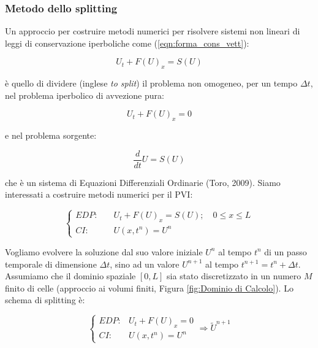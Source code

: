 \documentclass[12pt]{article} %
\begin{document}
\subsubsection{Metodo dello splitting}

\noindent Un approccio per costruire metodi numerici per risolvere sistemi non lineari di leggi di conservazione iperboliche come (\ref{eqn:forma_cons_vett}):

\begin{equation}
    U_t+F(U)_x=S(U)
    \label{eqn:sistema_EDP_non_omogenea}
\end{equation}

\noindent è quello di dividere (inglese \textit{to split}) il problema non omogeneo, per un tempo $\Delta t$, nel problema iperbolico di avvezione pura:

\begin{equation}
    U_t+F(U)_x = 0
    \label{eqn:avvezione_pura}
\end{equation}

\noindent e nel problema sorgente:

\begin{equation}
    \frac{d}{dt}U = S(U)
    \label{eqn:sorgente}
\end{equation}

\noindent che è un sistema di Equazioni Differenziali Ordinarie (Toro, 2009).
Siamo interessati a costruire metodi numerici per il PVI:

\begin{equation}
    \begin{cases} EDP:\quad &U_t+F(U)_x = S(U);\quad 0\leq x \leq L\\
    CI: &U(x,t^n)=U^n
    \end{cases}
    \label{eqn:PVI_completo}
\end{equation}

\noindent Vogliamo evolvere la soluzione dal suo valore iniziale $U^n$ al tempo $t^n$ di un passo temporale di dimensione $\Delta t$, sino ad un valore $U^{n+1}$ al tempo $t^{n+1} = t^n + \Delta t$. Assumiamo che il dominio spaziale $[0, L]$ sia stato discretizzato in un numero $M$ finito di celle (approccio ai volumi finiti, Figura \ref{fig:Dominio di Calcolo}). Lo schema di splitting è:

\begin{equation}
    \left\{\begin{array}{lr}
        EDP: & U_t+F(U)_x = 0\\
        CI: & U(x,t^n)=U^n
        \end{array}
    \right. \Longrightarrow \tilde{U}^{n+1}
    \label{eqn:PVI_avvettivo}
\end{equation}
\end{document}
